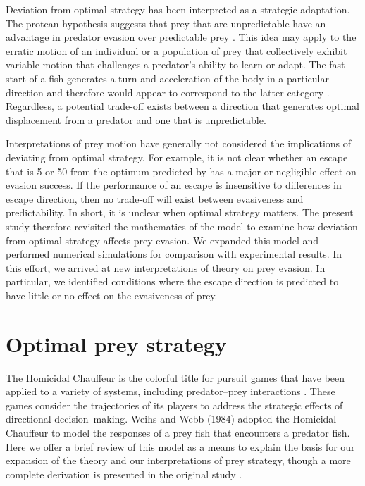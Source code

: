 \documentclass[12pt]{article}
\begin{document}
Deviation from optimal strategy has been interpreted as a strategic adaptation. The protean hypothesis suggests that prey that are unpredictable have an advantage in predator evasion over predictable prey \citep{Humphries:1970hy}. 
This idea may apply to the erratic motion of an individual or a population of prey that collectively exhibit variable motion that challenges a predator's ability to learn or adapt. 
The fast start of a fish generates a turn and acceleration of the body in a particular direction and therefore would appear to correspond to the latter category \citep{D:1973up}. 
Regardless, a potential trade-off exists between a direction that generates optimal displacement from a predator and one that is unpredictable.  

Interpretations of prey motion have generally not considered the implications of deviating from optimal strategy. For example, it is not clear whether an escape that is 5\textdegree\hspace{0.5pt} or 50\textdegree\hspace{0.5pt} from the optimum predicted by \cite{Weihs:1984tb} has a major or negligible effect on evasion success. 
If the performance of an escape is insensitive to differences in escape direction, then no trade-off will exist between evasiveness and predictability. In short, it is unclear when optimal strategy matters. 
The present study therefore revisited the mathematics of the \cite{Weihs:1984tb} model to examine how deviation from optimal strategy affects prey evasion. We expanded this model and performed numerical simulations for comparison with experimental results. In this effort, we arrived at new interpretations of theory on prey evasion. In particular, we identified conditions where the escape direction is predicted to have little or no effect on the evasiveness of prey.

\section{Optimal prey strategy}
\label{opt_strategy}

The Homicidal Chauffeur is the colorful title for pursuit games that have been applied to a variety of systems, including predator--prey interactions \citep{Isaacs:1965va}. These games consider the trajectories of its players to address the strategic effects of directional decision--making. 
Weihs and Webb (1984) adopted the Homicidal Chauffeur to model the responses of a prey fish that encounters a predator fish. Here we offer a brief review of this model as a means to explain the basis for our expansion of the theory and our interpretations of prey strategy, though a more complete derivation is presented in the original study \citep{Weihs:1984tb}.
\end{document}
